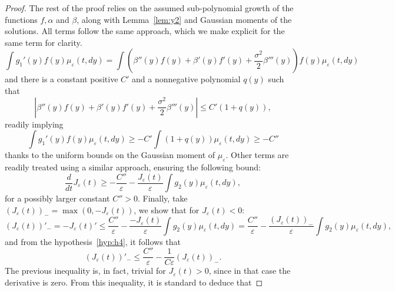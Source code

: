 \documentclass[onefignum,onetabnum]{siamart190516}
\newcommand{\1}{\mathbbm{1}}
\newcommand{\eps}{\varepsilon}
\begin{document}
\begin{proof}
The rest of the proof relies on the assumed sub-polynomial growth of the functions $f,\alpha$ and $\beta$, along with Lemma~\ref{lem:y2} and Gaussian moments of the solutions. All terms follow the same approach, which we make explicit for the same term for clarity. 
$$
\int  g_1'(y)f(y)\mu_\eps(t,dy) = \int \left(\beta''(y)f(y)+\beta'(y)f'(y)+\frac{\sigma^2}{2}\beta'''(y)\right)f(y)\mu_\eps(t,dy)
$$
and there is a constant positive $C'$ and a nonnegative polynomial $q(y)$ such that
$$
\left|\beta''(y)f(y)+\beta'(y)f'(y)+\frac{\sigma^2}{2}\beta'''(y)\right|\leq C'(1+q(y)),
$$
readily implying
$$
\int g_1'(y)f(y)\mu_\eps(t,dy)\geq -C'\int(1+q(y))\mu_\eps(t,dy)\geq -C''
$$
thanks to the uniform bounds on the Gaussian moment of $\mu_\eps$. Other terms are readily treated using a similar approach,
ensuring the following bound:
 $$
 \frac{d}{dt}J_\eps(t)\geq -\frac{C''}{\eps}-\frac{J_\eps(t)}{\eps}\int g_2(y)\mu_\eps(t,dy),
 $$
 for a possibly larger constant $C''>0$. Finally, take $(J_\eps(t))_- = \max(0,-J_\eps(t))$, we show that for $J_\eps(t)<0$:
$$
(J_\eps(t))'_- =-J_\eps(t)'\leq \frac{C''}{\eps}-\frac{-J_\eps(t)}{\eps}\int g_2(y)\mu_\eps(t,dy)= \frac{C''}{\eps}-\frac{(J_\eps(t))_-}{\eps}\int g_2(y)\mu_\eps(t,dy),
$$
and from the hypothesis~\eqref{hyp:h4}, it follows that
$$
(J_\eps(t))'_-\leq\frac{C''}{\eps}-\frac{1}{C\eps}(J_\eps(t))_-.
$$
The previous inequality is, in fact, trivial for $J_\eps(t)>0$, since in that case the derivative is zero. From this inequality, it is standard to deduce that

\end{proof}
\end{document}
